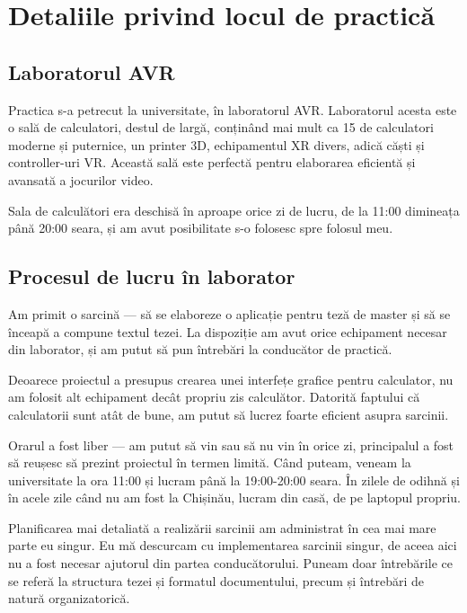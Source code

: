 \documentclass[a4paper,12pt]{report}
\begin{document}
\chapter{Detaliile privind locul de practică}

\section{Laboratorul AVR}

Practica s-a petrecut la universitate, în laboratorul AVR.
Laboratorul acesta este o sală de calculatori, destul de largă, conținând mai mult ca 15 de calculatori moderne și puternice, un printer \ac{3D}, echipamentul \ac{XR} divers, adică căști și controller-uri \ac{VR}.
Această sală este perfectă pentru elaborarea eficientă și avansată a jocurilor video.

Sala de calculători era deschisă în aproape orice zi de lucru, de la 11:00 dimineața până 20:00 seara, și am avut posibilitate s-o folosesc spre folosul meu.


\section{Procesul de lucru în laborator}

Am primit o sarcină --- să se elaboreze o aplicație pentru teză de master 
și să se înceapă a compune textul tezei.
La dispoziție am avut orice echipament necesar din laborator,
și am putut să pun întrebări la conducător de practică.

Deoarece proiectul a presupus crearea unei interfețe grafice pentru calculator,
nu am folosit alt echipament decât propriu zis calculător.
Datorită faptului că calculatorii sunt atât de bune, am putut să lucrez foarte eficient asupra sarcinii.

Orarul a fost liber --- am putut să vin sau să nu vin în orice zi, principalul a fost să reușesc să prezint proiectul în termen limită.
Când puteam, veneam la universitate la ora 11:00 și lucram până la 19:00-20:00 seara.
În zilele de odihnă și în acele zile când nu am fost la Chișinău, lucram din casă, de pe laptopul propriu.

Planificarea mai detaliată a realizării sarcinii am administrat în cea mai mare parte eu singur.
Eu mă descurcam cu implementarea sarcinii singur,
de aceea aici nu a fost necesar ajutorul din partea conducătorului.
Puneam doar întrebările ce se referă la structura tezei și formatul documentului,
precum și întrebări de natură organizatorică.
\end{document}
